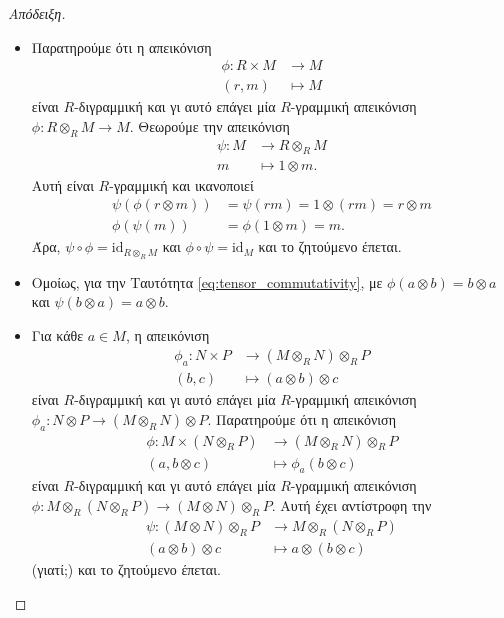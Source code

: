 \documentclass[12pt,a4paper,reqno]{amsart}
\theoremstyle{definition}
\theoremstyle{remark}
\numberwithin{theorem}{section}
\numberwithin{exercise}{section}
\numberwithin{equation}{section}
\renewcommand{\to}{\rightarrow}
\newcommand{\rmid}{\mathrm{id}}
\begin{document}
\begin{proof}[Απόδειξη]
    \leavevmode
    \begin{itemize} 
    \item[(1)] Παρατηρούμε ότι η απεικόνιση 
    \begin{align*}
        \phi : R\times M &\to M \\
               (r,m) &\mapsto M 
    \end{align*}
    είναι $R$-διγραμμική και γι αυτό επάγει μία $R$-γραμμική απεικόνιση $\phi : R \otimes_R M \to M$. Θεωρούμε την απεικόνιση 
    \begin{align*}
        \psi : M &\to R \otimes_R M \\
        m &\mapsto 1 \otimes m. 
    \end{align*}
    Αυτή είναι $R$-γραμμική και ικανοποιεί 
    \begin{align*}
        \psi\left(
            \phi\left(
                r \otimes m
            \right)
        \right) &= \psi(rm) = 1 \otimes (rm) = r \otimes m \\
        \phi\left(
            \psi\left(
                m
            \right)
        \right) &= \phi(1\otimes m) = m.
    \end{align*}
    Άρα, $\psi\circ\phi = \rmid_{R\otimes_R{M}}$ και $\phi\circ\psi = \rmid_M$ και το ζητούμενο έπεται.

    \item[(2)] Ομοίως, για την Ταυτότητα \eqref{eq:tensor_commutativity}, με $\phi(a\otimes b) = b \otimes a$ και $\psi(b \otimes a) = a \otimes b$.
    
    \item[(3)] Για κάθε $a \in M$, η απεικόνιση 
    \begin{align*}
        \phi_a : N \times P &\to \left(
            M \otimes_R N
        \right) \otimes_R P \\
        (b,c) &\mapsto (a \otimes b) \otimes c
    \end{align*}
    είναι $R$-διγραμμική και γι αυτό επάγει μία $R$-γραμμική απεικόνιση $\phi_a : N \otimes P \to \left(
            M \otimes_R N
        \right) \otimes P$. Παρατηρούμε ότι η απεικόνιση 
    \begin{align*}
        \phi : M \times \left(
            N \otimes_R P
        \right) &\to \left(
            M \otimes_R N
        \right) \otimes_R P \\
        (a, b\otimes c) &\mapsto \phi_a(b\otimes c) 
    \end{align*}
    είναι $R$-διγραμμική και γι αυτό επάγει μία $R$-γραμμική απεικόνιση $\phi : M \otimes_R \left(
            N \otimes_R P
        \right) \to \left(
            M \otimes N
        \right) \otimes_R P$. Αυτή έχει αντίστροφη την 
    \begin{align*}
        \psi : \left(
            M \otimes N
        \right) \otimes_R P &\to M \otimes_R \left(
            N \otimes_R P
        \right) \\ 
        \left(
            a \otimes b
        \right) \otimes c &\mapsto a \otimes \left(
            b \otimes c
        \right)
    \end{align*}
    (γιατί;) και το ζητούμενο έπεται.


\end{itemize}
\end{proof}
\end{document}
